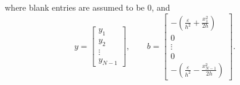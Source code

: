 \documentclass{homework}
\begin{document}
\begin{alphaparts}
		where blank entries are assumed to be 0, and
		\begin{equation*}
			y = \left[\begin{matrix}y_1 \\ y_2 \\ \vdots \\ y_{N-1}\end{matrix}\right], \qquad b = \left[\begin{matrix}-\left(\frac{\varepsilon}{h^2} + \frac{x_1^2}{2h}\right) \\ 0 \\ \vdots \\ 0 \\ -\left(\frac{\varepsilon}{h^2} - \frac{x_{N-1}^2}{2h}\right)\end{matrix}\right].
		\end{equation*}
		
		\questionpart
		
		\questionpart
		
		\questionpart
		
		\questionpart
	\end{alphaparts}
\end{document}
